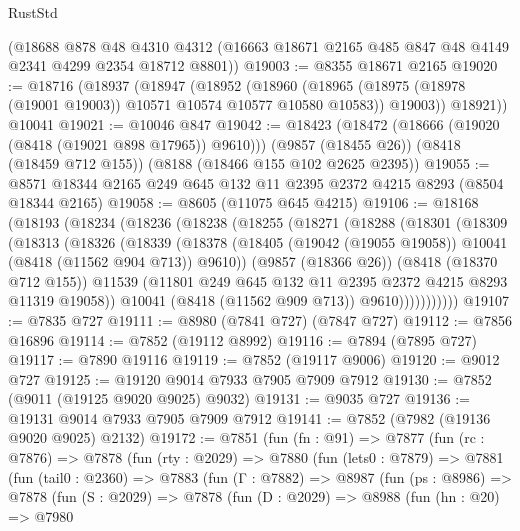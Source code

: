 \begin{lexlean}{RustStd}
\begin{coremodule}
    (@18688
      @878
      @48
      @4310
      @4312
      (@16663 @18671 @2165 @485 @847 @48 @4149 @2341 @4299 @2354 @18712 @8801))
@19003 := @8355 @18671 @2165
@19020 := @18716
    (@18937
      (@18947
        (@18952
          (@18960
            (@18965 (@18975 (@18978 (@19001 @19003)) @10571 @10574 @10577 @10580 @10583))
            @19003))
        @18921))
    @10041
@19021 := @10046 @847
@19042 := @18423
    (@18472 (@18666 (@19020 (@8418 (@19021 @898 @17965)) @9610)))
    (@9857 (@18455 @26))
    (@8418 (@18459 @712 @155))
    (@8188 (@18466 @155 @102 @2625 @2395))
@19055 := @8571 @18344 @2165 @249 @645 @132 @11 @2395 @2372 @4215 @8293 (@8504 @18344 @2165)
@19058 := @8605 (@11075 @645 @4215)
@19106 := @18168
    (@18193
      (@18234
        (@18236
          (@18238
            (@18255
              (@18271
                (@18288
                  (@18301
                    (@18309
                      (@18313
                        (@18326
                          (@18339
                            (@18378
                              (@18405
                                (@19042 (@19055 @19058))
                                @10041
                                (@8418 (@11562 @904 @713))
                                @9610))
                            (@9857 (@18366 @26))
                            (@8418 (@18370 @712 @155))
                            @11539
                            (@11801 @249 @645 @132 @11 @2395 @2372 @4215 @8293 @11319 @19058))
                          @10041
                          (@8418 (@11562 @909 @713))
                          @9610)))))))))))
@19107 := @7835 @727
@19111 := @8980 (@7841 @727) (@7847 @727)
@19112 := @7856 @16896
@19114 := @7852 (@19112 @8992)
@19116 := @7894 (@7895 @727)
@19117 := @7890 @19116
@19119 := @7852 (@19117 @9006)
@19120 := @9012 @727
@19125 := @19120 @9014 @7933 @7905 @7909 @7912
@19130 := @7852 (@9011 (@19125 @9020 @9025) @9032)
@19131 := @9035 @727
@19136 := @19131 @9014 @7933 @7905 @7909 @7912
@19141 := @7852 (@7982 (@19136 @9020 @9025) @2132)
@19172 := @7851
    (fun (fn : @91) =>
    @7877
      (fun (rc : @7876) =>
      @7878
        (fun (rty : @2029) =>
        @7880
          (fun (lets0 : @7879) =>
          @7881
            (fun (tail0 : @2360) =>
            @7883
              (fun (Γ : @7882) =>
              @8987
                (fun (ps : @8986) =>
                @7878
                  (fun (S : @2029) =>
                  @7878
                    (fun (D : @2029) =>
                    @8988
                      (fun (hn : @20) =>
                      @7980

\end{coremodule}
\end{lexlean}
